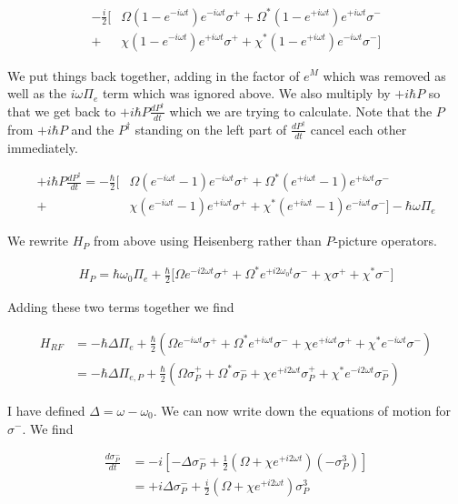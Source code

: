 \documentclass[12pt]{article}
\newcommand{\ddt}[1]{\frac{d #1}{dt}}
\begin{document}
\begin{align}
-\frac{i}{2}\Bigg[&\Omega(1-e^{-i\omega t})e^{-i\omega t}\sigma^+ + \Omega^*(1-e^{+i\omega t})e^{+i\omega t}\sigma^-\\
+&\chi (1-e^{-i\omega t})e^{+i\omega t}\sigma^+ + \chi^* (1-e^{+i\omega t})e^{-i\omega t} \sigma^-\Bigg]
\end{align}

We put things back together, adding in the factor of $e^M$ which was removed as well as the $i\omega \Pi_e$ term which was ignored above. We also multiply by $+i\hbar P$ so that we get back to $+i\hbar P \ddt{P^{\dag}}$ which we are trying to calculate. Note that the $P$ from $+i\hbar P$ and the $P^{\dag}$ standing on the left part of $\ddt{P^{\dag}}$ cancel each other immediately.

\begin{align}
+i\hbar P \ddt{P^{\dag}} = -\frac{\hbar}{2}\Bigg[&\Omega(e^{-i\omega t}-1)e^{-i\omega t}\sigma^+ + \Omega^*(e^{+i\omega t}-1)e^{+i\omega t}\sigma^-\\
+&\chi (e^{-i\omega t}-1)e^{+i\omega t}\sigma^+ + \chi^* (e^{+i\omega t}-1)e^{-i\omega t} \sigma^-\Bigg] - \hbar \omega \Pi_e
\end{align}

We rewrite $H_P$ from above using Heisenberg rather than $P$-picture operators.

\begin{align}
H_P = \hbar \omega_0 \Pi_e + \frac{\hbar}{2}\Bigg[\Omega e^{-i2\omega t} \sigma^+ + \Omega^* e^{+i2\omega_0t}\sigma^- + \chi\sigma^+ + \chi^* \sigma^-\Bigg]
\end{align}

Adding these two terms together we find

\begin{align}
H_{RF} &= -\hbar \Delta \Pi_e + \frac{\hbar}{2}\left(\Omega e^{-i\omega t}\sigma^+ + \Omega^* e^{+i\omega t}\sigma^- + \chi e^{+i\omega t}\sigma^+ + \chi^* e^{-i\omega t} \sigma^- \right)\\
&= -\hbar \Delta \Pi_{e,P} + \frac{\hbar}{2}\left(\Omega \sigma^+_P + \Omega^* \sigma^-_P + \chi e^{+i2\omega t}\sigma^+_P + \chi^* e^{-i2\omega t}\sigma^-_P \right)
\end{align}

I have defined $\Delta = \omega - \omega_0$. We can now write down the equations of motion for $\sigma^-$. We find

\begin{align}
\ddt{\sigma^-_P} &= -i\left[-\Delta \sigma^-_P + \frac{1}{2}\left(\Omega + \chi e^{+i2\omega t} \right)(-\sigma^3_P)  \right]\\
&= +i\Delta \sigma^-_P + \frac{i}{2}(\Omega + \chi e^{+i2\omega t})\sigma^3_P
\end{align}
\end{document}
